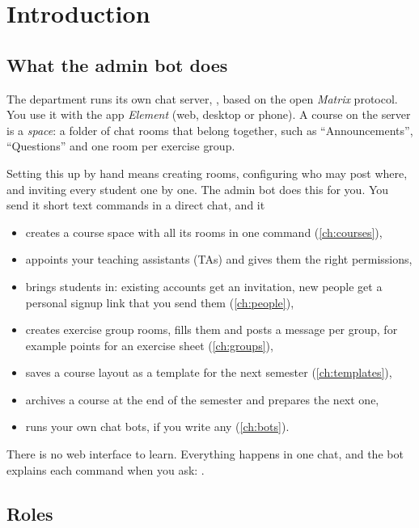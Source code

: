 \chapter{Introduction}
\label{ch:intro}

\section{What the admin bot does}

The department runs its own chat server, \server, based on the open \emph{Matrix} protocol.
You use it with the app \emph{Element} (web, desktop or phone). A course on the server is a
\emph{space}: a folder of chat rooms that belong together, such as \enquote{Announcements},
\enquote{Questions} and one room per exercise group.

Setting this up by hand means creating rooms, configuring who may post where, and inviting
every student one by one. The admin bot \botid{} does this for you. You send it short text
commands in a direct chat, and it

\begin{itemize}
  \item creates a course space with all its rooms in one command (\autoref{ch:courses}),
  \item appoints your teaching assistants (TAs) and gives them the right permissions,
  \item brings students in: existing accounts get an invitation, new people get a personal
        signup link that you send them (\autoref{ch:people}),
  \item creates exercise group rooms, fills them and posts a message per group, for example
        points for an exercise sheet (\autoref{ch:groups}),
  \item saves a course layout as a template for the next semester (\autoref{ch:templates}),
  \item archives a course at the end of the semester and prepares the next one,
  \item runs your own chat bots, if you write any (\autoref{ch:bots}).
\end{itemize}

There is no web interface to learn. Everything happens in one chat, and the bot explains
each command when you ask: .

\section{Roles}
\label{sec:roles}


